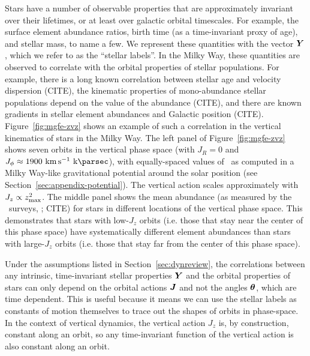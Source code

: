 Stars have a number of observable properties that are approximately invariant over their
lifetimes, or at least over galactic orbital timescales.
For example, the surface element abundance ratios, birth time (as a time-invariant proxy
of age), and stellar mass, to name a few.
We represent these quantities with the vector $\boldsymbol{Y}$, which we refer to as the
``stellar labels''.
In the Milky Way, these quantities are observed to correlate with the orbital
properties of stellar populations.
For example, there is a long known correlation between stellar age and velocity
dispersion (CITE), the kinematic properties of mono-abundance stellar populations depend
on the value of the abundance (CITE), and there are known gradients in stellar element
abundances and Galactic position (CITE).
Figure~\ref{fig:mgfe-zvz} shows an example of such a correlation in the vertical
kinematics of stars in the Milky Way.
The left panel of Figure~\ref{fig:mgfe-zvz} shows seven orbits in the vertical phase
space (with $J_R=0$ and $J_\phi \approx 1900~\kms~\kpc$), with equally-spaced values of
\zmax\ as computed in a Milky Way-like gravitational potential around the solar position
(see Section~\ref{sec:appendix-potential}).
The vertical action scales approximately with $J_z \propto z_{\textrm{max}}^2$.
The middle panel shows the mean  abundance (as measured by the \apogee\
surveys, ; CITE) for stars in different locations of the vertical phase space.
This demonstrates that stars with low-$J_z$ orbits (i.e. those that stay near the center
of this phase space) have systematically different element abundances than stars with
large-$J_z$ orbits (i.e. those that stay far from the center of this phase space).



Under the assumptions listed in Section~\ref{sec:dynreview}, the correlations between
any intrinsic, time-invariant stellar properties $\boldsymbol{Y}$ and the orbital properties of
stars can only depend on the orbital actions $\boldsymbol{J}$ and not the angles $\boldsymbol{\theta}$,
which are time dependent.
This is useful because it means we can use the stellar labels as constants of motion
themselves to trace out the shapes of orbits in phase-space.
In the context of vertical dynamics, the vertical action $J_z$ is, by construction,
constant along an orbit, so any time-invariant function of the vertical action is also
constant along an orbit.

